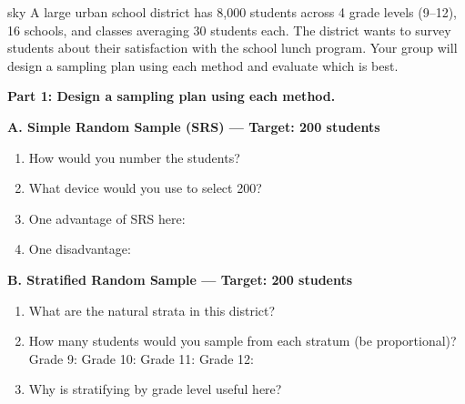 \documentclass[10pt]{article}
\begin{document}
\namepartnerperiod

\vspace{0.1in}

\begin{scenariobox}[Context]{sky}
\small
A large urban school district has 8{,}000 students across 4 grade levels (9--12),
16 schools, and classes averaging 30 students each. The district wants to survey
students about their satisfaction with the school lunch program.
Your group will design a sampling plan using each method and evaluate which is best.
\end{scenariobox}

\vspace{0.1in}

\textbf{Part 1: Design a sampling plan using each method.}

\begin{practicebox}
\small
\textbf{A. Simple Random Sample (SRS) --- Target: 200 students}

\begin{enumerate}[leftmargin=1.5em, itemsep=6pt]
  \item How would you number the students? \blank{9cm}
  \item What device would you use to select 200? \blank{9cm}
  \item One advantage of SRS here: \blank{9cm}
  \item One disadvantage: \blank{9cm}
\end{enumerate}
\end{practicebox}

\vspace{0.1in}

\begin{practicebox}
\small
\textbf{B. Stratified Random Sample --- Target: 200 students}

\begin{enumerate}[leftmargin=1.5em, itemsep=6pt]
  \item What are the natural strata in this district? \blank{8cm}
  \item How many students would you sample from each stratum (be proportional)?\\
        Grade 9: \blank{2cm} \quad Grade 10: \blank{2cm} \quad Grade 11: \blank{2cm}
        \quad Grade 12: \blank{2cm}
  \item Why is stratifying by grade level useful here?\\
        \writeline\\[1pt]\writeline
\end{enumerate}
\end{practicebox}
\end{document}
